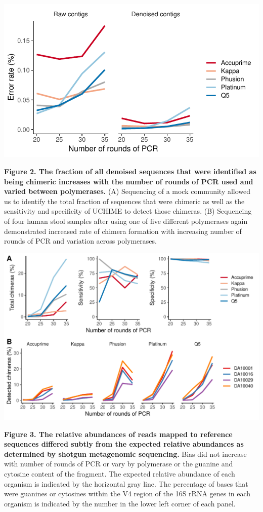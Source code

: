 \documentclass[11pt,]{article}
\begin{document}
\includegraphics{../results/figures/mock_error.pdf}

\newpage

\textbf{Figure 2. The fraction of all denoised sequences that were
identified as being chimeric increases with the number of rounds of PCR
used and varied between polymerases.} (A) Sequencing of a mock community
allowed us to identify the total fraction of sequences that were
chimeric as well as the sensitivity and specificity of UCHIME to detect
those chimeras. (B) Sequencing of four human stool samples after using
one of five different polymerases again demonstrated increased rate of
chimera formation with increasing number of rounds of PCR and variation
across polymerases.

\includegraphics[width=1.0\columnwidth]{../results/figures/chimera_plots.pdf}

\newpage

\textbf{Figure 3. The relative abundances of reads mapped to reference
sequences differed subtly from the expected relative abundances as
determined by shotgun metagenomic sequencing.} Bias did not increase
with number of rounds of PCR or vary by polymerase or the guanine and
cytosine content of the fragment. The expected relative abundance of
each organism is indicated by the horizontal gray line. The percentage
of bases that were guanines or cytosines within the V4 region of the 16S
rRNA genes in each organism is indicated by the number in the lower left
corner of each panel.
\end{document}
